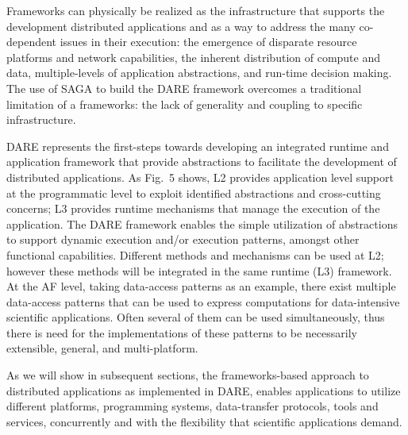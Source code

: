 \documentclass[]{svjour3}
\begin{document}
Frameworks can physically be realized as the infrastructure that
supports the development distributed applications and as a way to
address the many co-dependent issues in their execution: the emergence
of disparate resource platforms and network capabilities, the inherent
distribution of compute and data, multiple-levels of application
abstractions, and run-time decision making.  The use of SAGA to build
the DARE framework overcomes a traditional limitation of a frameworks:
the lack of generality and coupling to specific infrastructure.

DARE represents the first-steps towards developing an integrated
runtime and application framework that provide abstractions to
facilitate the development of distributed applications.  As Fig.~5
shows, L2 provides application level support at the programmatic level
to exploit identified abstractions and cross-cutting concerns; L3
provides runtime mechanisms that manage the execution of the
application.  The DARE framework enables the simple utilization of
abstractions to support dynamic execution and/or execution patterns,
amongst other functional capabilities.  Different methods and
mechanisms can be used at L2; however these methods will be integrated
in the same runtime (L3) framework.  At the AF level, taking
data-access patterns as an example, there exist multiple data-access
patterns that can be used to express computations for data-intensive
scientific applications. Often several of them can be used
simultaneously, thus there is need for the implementations of these
patterns to be necessarily extensible, general, and multi-platform.

As we will show in subsequent sections, the frameworks-based approach
to distributed applications as implemented in DARE, enables
applications to utilize different platforms, programming systems,
data-transfer protocols, tools and services, concurrently and with the
flexibility that scientific applications demand.  \\


\end{document}
